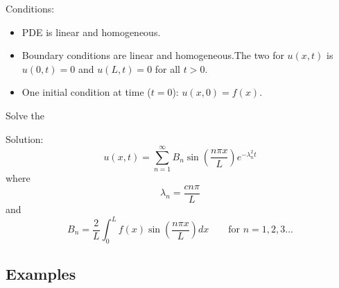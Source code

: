 Conditions:
\begin{itemize}
  \item PDE is linear and homogeneous.
  \item Boundary conditions are linear and homogeneous.The two for $u(x,t)$ is $u(0,t)=0$ and $u(L,t)=0$ for all $t>0$.
  \item One initial condition at time ($t=0$): $u(x,0)=f(x)$.
\end{itemize}
Solve the 

Solution:
$$u(x,t)=\sum_{n=1}^{\infty}B_n\sin\left(\frac{n\pi x}{L}\right)e^{-\lambda_n^2t}$$
where
$$\lambda_n = \frac{cn\pi}{L}$$
and
$$B_n = \frac{2}{L}\int_0^Lf(x)\sin\left(\frac{n\pi x}{L}\right)dx\quad\quad \text{for }n=1,2,3\dots$$
\subsection{Examples}

